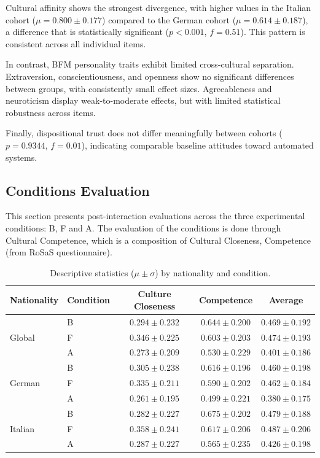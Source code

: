 Cultural affinity shows the strongest divergence, with higher values in the Italian cohort ($\mu = 0.800 \pm 0.177$) compared to the German cohort ($\mu = 0.614 \pm 0.187$), a difference that is statistically significant ($p < 0.001$, $f = 0.51$). This pattern is consistent across all individual items.

In contrast, BFM personality traits exhibit limited cross-cultural separation. 
Extraversion, conscientiousness, and openness show no significant differences between groups, with consistently small effect sizes. Agreeableness and neuroticism display weak-to-moderate effects, but with limited statistical robustness across items. 

Finally, dispositional trust does not differ meaningfully between cohorts ($p = 0.9344$, $f = 0.01$), indicating comparable baseline attitudes toward automated systems.

\subsection{Conditions Evaluation}

This section presents post-interaction evaluations across the three experimental conditions: B, F and A. 
The evaluation of the conditions is done through Cultural Competence, which is a composition of Cultural Closeness, Competence (from RoSaS questionnaire).

\begin{table}[!ht]
\centering
\begin{tabular}{llccc}
\toprule
Nationality & Condition & Culture Closeness & Competence & Average \\
\midrule
\multirow{3}{*}{Global}
 & B & $0.294 \pm 0.232$ & $0.644 \pm 0.200$ & $0.469 \pm 0.192$ \\
 & F & $0.346 \pm 0.225$ & $0.603 \pm 0.203$ & $0.474 \pm 0.193$ \\
 & A & $0.273 \pm 0.209$ & $0.530 \pm 0.229$ & $0.401 \pm 0.186$ \\
\midrule
\multirow{3}{*}{German}
 & B & $0.305 \pm 0.238$ & $0.616 \pm 0.196$ & $0.460 \pm 0.198$ \\
 & F & $0.335 \pm 0.211$ & $0.590 \pm 0.202$ & $0.462 \pm 0.184$ \\
 & A & $0.261 \pm 0.195$ & $0.499 \pm 0.221$ & $0.380 \pm 0.175$ \\
\midrule
\multirow{3}{*}{Italian}
 & B & $0.282 \pm 0.227$ & $0.675 \pm 0.202$ & $0.479 \pm 0.188$ \\
 & F & $0.358 \pm 0.241$ & $0.617 \pm 0.206$ & $0.487 \pm 0.206$ \\
 & A & $0.287 \pm 0.227$ & $0.565 \pm 0.235$ & $0.426 \pm 0.198$ \\
\bottomrule
\end{tabular}
\caption{Descriptive statistics ($\mu \pm \sigma$) by nationality and condition.}
\label{tab:nat_desc_stats}
\end{table}

